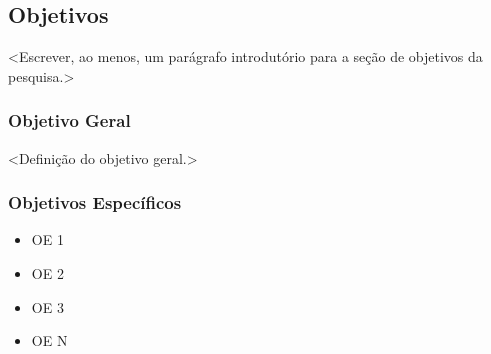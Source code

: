 \subsection{Objetivos}
<Escrever, ao menos, um parágrafo introdutório para a seção de objetivos da pesquisa.>

\subsubsection{Objetivo Geral}

<Definição do objetivo geral.>

\subsubsection{Objetivos Específicos}

\vspace{0.7cm}

\begin{itemize}[label=$\bullet$]
    \item OE 1
    \item OE 2
    \item OE 3
    \item OE N
\end{itemize}